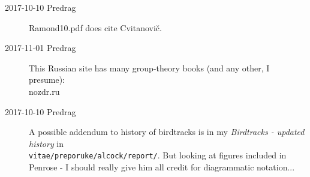 \begin{description}
\item[2017-10-10  Predrag]
Ramond10.pdf does cite Cvitanovi\v{c}.

\item[2017-11-01 Predrag]
This Russian site has many group-theory books (and any other, I presume):\\
 {nozdr.ru}


\item[2017-10-10  Predrag]
A possible addendum to history of birdtracks is in my
{\em Birdtracks - updated history} in\\
\texttt{vitae/preporuke/alcock/report/}.
But looking at figures included in Penrose - I should
really give him all credit for diagrammatic notation...



\end{description}


\printbibliography[heading=subbibintoc,title={References}]

